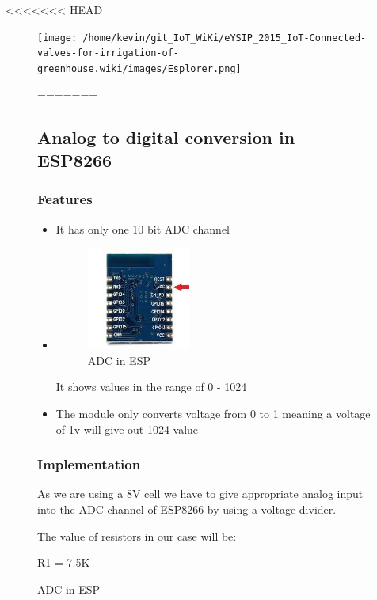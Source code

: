 \documentclass[16pt]{article}
\begin{document}
<<<<<<< HEAD
 \begin{figure}
\hspace{1cm}
\texttt{[image: /home/kevin/git\_IoT\_WiKi/eYSIP\_2015\_IoT-Connected-valves-for-irrigation-of-greenhouse.wiki/images/Esplorer.png]}
\caption{ESPlorer IDE}
=======


\subsection{Analog to digital conversion in
ESP8266}

\subsubsection{Features}
\begin{itemize}
\item
  It has only one 10 bit ADC channel
\item

\begin{figure}
\hspace{3cm}
\includegraphics[width=0.4\textwidth]{images/ADC.jpeg}
\caption{ADC in ESP}
\end{figure}
  It shows values in the range of 0 - 1024
\item
  The module only converts voltage from 0 to 1 meaning a voltage of 1v
  will give out 1024 value
\end{itemize}


\subsubsection{Implementation}


  As we are using a 8V cell we have to give appropriate analog input
  into the ADC channel of ESP8266 by using a voltage divider.




The value of resistors in our case will be:

R1 = 7.5K


\end{figure}
\end{document}
